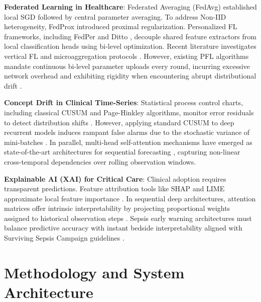 \documentclass{llncs}
\begin{document}
\textbf{Federated Learning in Healthcare}: Federated Averaging (FedAvg) \cite{mcmahan2017} established local SGD followed by central parameter averaging. To address Non-IID heterogeneity, FedProx \cite{liu2022} introduced proximal regularization. Personalized FL frameworks, including FedPer \cite{arivazhagan2020} and Ditto \cite{wang2025personalized}, decouple shared feature extractors from local classification heads using bi-level optimization. Recent literature investigates vertical FL \cite{yang2025mvfl} and microaggregation protocols \cite{maurya2025secure}. However, existing PFL algorithms mandate continuous bi-level parameter uploads every round, incurring excessive network overhead and exhibiting rigidity when encountering abrupt distributional drift \cite{zhang2022multitask, abdelsater2024llama}.

\textbf{Concept Drift in Clinical Time-Series}: Statistical process control charts, including classical CUSUM and Page-Hinkley algorithms, monitor error residuals to detect distribution shifts \cite{jothimurugesan2022}. However, applying standard CUSUM to deep recurrent models induces rampant false alarms due to the stochastic variance of mini-batches \cite{bernardi2023adaptive}. In parallel, multi-head self-attention mechanisms have emerged as state-of-the-art architectures for sequential forecasting \cite{larocca2021attention, tang2025horizon}, capturing non-linear cross-temporal dependencies over rolling observation windows.

\textbf{Explainable AI (XAI) for Critical Care}: Clinical adoption requires transparent predictions. Feature attribution tools like SHAP and LIME approximate local feature importance \cite{larocca2022shap, kalakoti2025fedxai}. In sequential deep architectures, attention matrices offer intrinsic interpretability by projecting proportional weights assigned to historical observation steps \cite{lei2025supervised}. Sepsis early warning architectures must balance predictive accuracy with instant bedside interpretability aligned with Surviving Sepsis Campaign guidelines \cite{qayyum2023fedsepsis, maher2025automl}.

\section{Methodology and System Architecture}
\label{sec:methodology}
\end{document}
